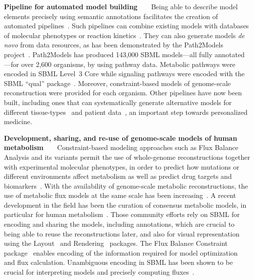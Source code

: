\documentclass{sbml-paper}
\begin{document}
\textbf{Pipeline for automated model building}~~~~Being able to describe model elements precisely using semantic annotations facilitates the creation of automated pipelines~\citep{Drager2010automating}. Such pipelines can combine existing models with databases of molecular phenotypes or reaction kinetics~\citep{li2010systematic}.  They can also generate models \emph{de novo} from data resources, as has been demonstrated by the Path2Models project~\citep{buchel2013path2models}. Path2Models has produced 143,000 SBML models---all fully annotated---for over 2,600 organisms, by using pathway data. Metabolic pathways were encoded in SBML Level~3 Core while signaling pathways were encoded with the SBML ``qual'' package~\citep{chaouiya2013sbml}. Moreover, constraint-based models of genome-scale reconstruction were provided for each organism. Other pipelines have now been built, including ones that can systematically generate alternative models for different tissue-types~\citep{wang2012reconstruction} and patient data~\citep{uhlen2017pathology}, an important step towards personalized medicine.

\textbf{Development, sharing, and re-use of genome-scale models of human metabolism}~~~~Constraint-based modeling approaches such as Flux Balance Analysis and its variants permit the use of whole-genome reconstructions together with experimental molecular phenotypes, in order to predict how mutations or different environments affect metabolism as well as predict drug targets and biomarkers~\citep{obrien2015}.  With the availability of genome-scale metabolic reconstructions, the use of metabolic flux models at the same scale has been increasing~\citep{Bordbar2014a}. A recent development in the field has been the curation of consensus metabolic models, in particular for human metabolism~\citep{brunk2018}. Those community efforts rely on SBML for encoding and sharing the models, including annotations, which are crucial to being able to reuse the reconstructions later, and also for visual representation using the Layout~\citep{Gauges2015} and Rendering~\citep{Bergmann2018sbml} packages. The Flux Balance Constraint package~\citep{Olivier2018a} enables encoding of the information required for model optimization and flux calculation.  Unambiguous encoding in SBML has been shown to be crucial for interpreting models and precisely computing fluxes~\citep{Ebrahim2015, Ravikrishnan2015critical}.

\hrulefill
\newpage

\end{document}
